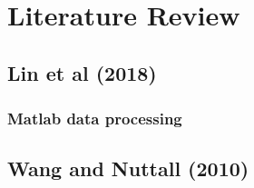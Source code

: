 \chapter{Literature Review}
\section{Lin et al (2018) \cite{lin2018adapting}}
\paragraph{}


\paragraph{}


\paragraph{}


\paragraph{}


\subsection*{Matlab data processing}


\paragraph{}


\section{Wang and Nuttall (2010) \cite{wang2010phase}}


\paragraph{}
